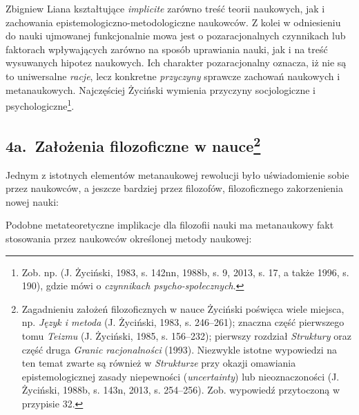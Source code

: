\begin{artplenv}{Zbigniew Liana}
kształtujące \textit{implicite} zarówno treść teorii naukowych, jak i zachowania epistemologiczno-metodologiczne
naukowców. Z kolei w odniesieniu do nauki ujmowanej funkcjonalnie mowa jest o pozaracjonalnych czynnikach lub faktorach
wpływających zarówno na sposób uprawiania nauki, jak i na treść wysuwanych hipotez naukowych. Ich charakter
pozaracjonalny oznacza, iż nie są to uniwersalne\textit{ racje}, lecz konkretne \textit{przyczyny} sprawcze zachowań
naukowych i metanaukowych. Najczęściej Życiński wymienia przyczyny socjologiczne i psychologiczne\footnote{Zob. np. 
\label{ref:RNDijWA45P0nD}(J. Życiński, 1983, s. 142nn, 1988b, s. 9, 2013, s. 17,  a także 1996, s. 190), gdzie
mówi o \textit{czynnikach psycho-społecznych}.}.

\subsection{4a.~Założenia filozoficzne w nauce\footnote{Zagadnieniu założeń filozoficznych w nauce Życiński poświęca wiele miejsca,
np. \textit{Język i metoda} \label{ref:RNDXAivjQttgc}(J. Życiński, 1983, s. 246–261); znaczna część pierwszego tomu
\textit{Teizmu} \label{ref:RND6qvog2NMv7}(J. Życiński, 1985, s. 156–232); pierwszy rozdział \textit{Struktury} oraz część
druga \textit{Granic racjonalności} (1993). Niezwykle istotne wypowiedzi na ten temat zwarte są również w
\textit{Strukturze} przy okazji omawiania epistemologicznej zasady niepewności (\textit{uncertainty}) lub nieoznaczoności
\label{ref:RND7zd8YYNkba}(J. Życiński, 1988b, s. 143n, 2013, s. 254–256). Zob. wypowiedź przytoczoną w przypisie 32.}}

Jednym z istotnych elementów metanaukowej rewolucji było uświadomienie sobie przez naukowców, a jeszcze bardziej przez
filozofów, filozoficznego zakorzenienia nowej nauki:

Podobne metateoretyczne implikacje dla filozofii nauki ma metanaukowy fakt stosowania przez naukowców określonej metody
naukowej: 


\end{artplenv}

